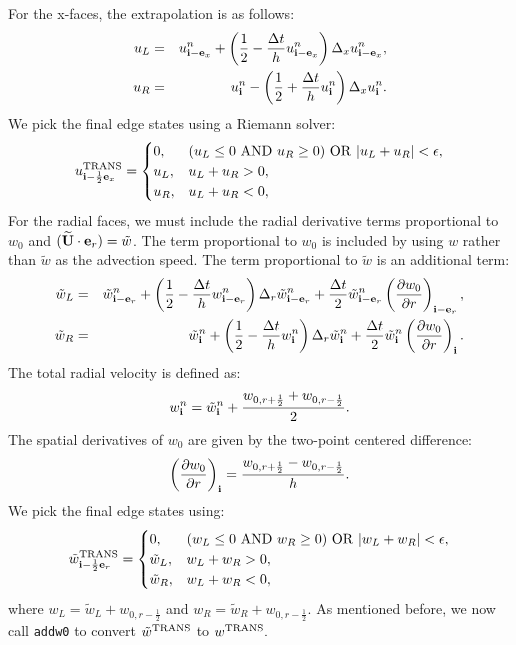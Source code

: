\documentclass[11pt]{article}
\def\half  {\frac{1}{2}}
\def\dt    {\Delta t}
\def\trans {\rm TRANS}
\def\eb    {{\bf e}}
\def\ib    {{\bf i}}
\def\Ubt   {\widetilde{\bf U}}
\def\wt    {\tilde{w}}
\begin{document}
For the x-faces, the extrapolation is as follows:
\begin{eqnarray}
u_L &=& u_{\ib-\eb_x}^n + \left(\half - \frac{\dt}{h}u_{\ib-\eb_x}^n\right)\Delta_x u_{\ib-\eb_x}^n, \\
u_R &=& u_{\ib}^n - \left(\half + \frac{\dt}{h}u_{\ib}^n\right)\Delta_x u_{\ib}^n.
\end{eqnarray}
We pick the final edge states using a Riemann solver:
\begin{equation}
u^{\trans}_{\ib-\half\eb_x} =
\begin{cases}
0, & (u_L \le 0 ~ {\rm AND} ~ u_R \ge 0) ~ {\rm OR} ~ |u_L + u_R| < \epsilon, \\
u_L, & u_L + u_R > 0, \\
u_R, & u_L + u_R < 0, \\
\end{cases}
\end{equation}
For the radial faces, we must include the radial derivative terms proportional to $w_0$ and $(\Ubt\cdot\eb_r) = \wt$.  The term proportional to $w_0$ is included by using $w$ rather than $\wt$ as the advection speed.  The term proportional to $\wt$ is an additional term:
\begin{eqnarray}
\wt_L &=& \wt_{\ib-\eb_r}^n + \left(\half - \frac{\dt}{h}w_{\ib-\eb_r}^n\right)\Delta_r \wt_{\ib-\eb_r}^n + \frac{\dt}{2}\wt_{\ib-\eb_r}^n\left(\frac{\partial w_0}{\partial r}\right)_{\ib-\eb_r},\label{Radial utrans_L} \\
\wt_R &=& \wt_{\ib}^n + \left(\half - \frac{\dt}{h}w_{\ib}^n\right)\Delta_r \wt_{\ib}^n + \frac{\dt}{2}\wt_{\ib}^n\left(\frac{\partial w_0}{\partial r}\right)_{\ib}.\label{Radial utrans_R}
\end{eqnarray}
The total radial velocity is defined as:
\begin{equation}
w_{\ib}^n = \wt_{\ib}^n + \frac{w_{0,r+\half}+w_{0,r-\half}}{2}.\label{Total Radial Velocity}
\end{equation}
The spatial derivatives of $w_0$ are given by the two-point centered difference:
\begin{equation}
\left(\frac{\partial w_0}{\partial r}\right)_{\ib} = \frac{w_{0,r+\half}-w_{0,r-\half}}{h}.\label{Radial Derivative of w_0}
\end{equation}
We pick the final edge states using:
\begin{equation}
\wt^{\trans}_{\ib-\half\eb_r} =
\begin{cases}
0, & (w_L \le 0 ~ {\rm AND} ~ w_R \ge 0) ~ {\rm OR} ~ |w_L + w_R| < \epsilon, \\
\wt_L, & w_L + w_R > 0, \\
\wt_R, & w_L + w_R < 0, \\
\end{cases}
\end{equation}
where $w_L = \wt_L + w_{0,r-\half}$ and $w_R = \wt_R + w_{0,r-\half}$.  As mentioned before, we now call {\tt addw0} to convert $\wt^{\trans}$ to $w^{\trans}.$
\end{document}
